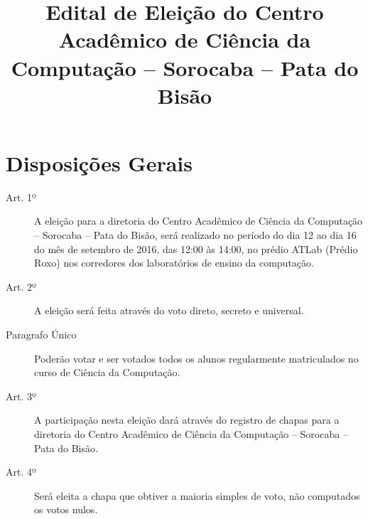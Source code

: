 \documentclass[12pt]{article}
\title{Edital de Eleição do Centro Acadêmico de Ciência da Computação -- Sorocaba -- Pata do Bisão}
\begin{document}
\maketitle

\section*{Disposições Gerais}
\begin{description}
	\item[Art. 1º] A eleição para a diretoria do Centro Acadêmico de Ciência da Computação -- Sorocaba -- Pata do Bisão, será realizado no período do dia 12 ao dia 16 do mês de setembro de 2016, das 12:00 às 14:00, no prédio ATLab (Prédio Roxo) nos corredores dos laboratórios de ensino da computação. 
	\item[Art. 2º] A eleição será feita através do voto direto, secreto e universal.
	\item[Paragrafo Único] Poderão  votar  e  ser  votados  todos  os  alunos regularmente matriculados  no  curso  de Ciência da Computação. 
	\item[Art. 3º] A participação nesta eleição dará através do registro de chapas para a diretoria do Centro Acadêmico de Ciência da Computação -- Sorocaba -- Pata do Bisão.
	\item[Art. 4º] Será eleita a chapa que obtiver a maioria simples de voto, não computados os votos nulos.
\end{description}
\end{document}
